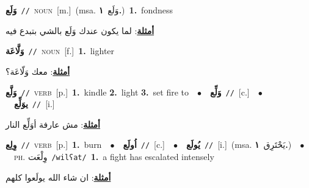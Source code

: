 \documentclass[10pt,a4paper,twoside]{article} %
\begin{document}
\begin{multicols}{2}
{\setlength\topsep{0pt}\textbf{\foreignlanguage{arabic}{وَلَع}}\ {\color{gray}\texttt{//}\color{black}}\ \textsc{noun}\ [m.]\ \color{gray}(msa. \foreignlanguage{arabic}{وَلَع}~\foreignlanguage{arabic}{\textbf{١.}})\color{black}\ \textbf{1.}~fondness\  \begin{flushright}\color{gray}\foreignlanguage{arabic}{\textbf{\underline{\foreignlanguage{arabic}{أمثلة}}}: لما يكون عندك وَلَع بالشي بتبدع فيه}\end{flushright}\color{black}} \vspace{2mm}

{\setlength\topsep{0pt}\textbf{\foreignlanguage{arabic}{وَلَّاعَة}}\ {\color{gray}\texttt{//}\color{black}}\ \textsc{noun}\ [f.]\ \textbf{1.}~lighter\  \begin{flushright}\color{gray}\foreignlanguage{arabic}{\textbf{\underline{\foreignlanguage{arabic}{أمثلة}}}: معك وَلّاعَة؟}\end{flushright}\color{black}} \vspace{2mm}

{\setlength\topsep{0pt}\textbf{\foreignlanguage{arabic}{وَلَّع}}\ {\color{gray}\texttt{//}\color{black}}\ \textsc{verb}\ [p.]\ \textbf{1.}~kindle  \textbf{2.}~light  \textbf{3.}~set fire to\ \ $\bullet$\ \ \setlength\topsep{0pt}\textbf{\foreignlanguage{arabic}{وَلِّع}}\ {\color{gray}\texttt{//}\color{black}}\ [c.]\ \ $\bullet$\ \ \setlength\topsep{0pt}\textbf{\foreignlanguage{arabic}{يوَلِّع}}\ {\color{gray}\texttt{//}\color{black}}\ [i.]\  \begin{flushright}\color{gray}\foreignlanguage{arabic}{\textbf{\underline{\foreignlanguage{arabic}{أمثلة}}}: مش عارفة أوَلِّع النار}\end{flushright}\color{black}} \vspace{2mm}

{\setlength\topsep{0pt}\textbf{\foreignlanguage{arabic}{وِلِع}}\ {\color{gray}\texttt{//}\color{black}}\ \textsc{verb}\ [p.]\ \textbf{1.}~burn\ \ $\bullet$\ \ \setlength\topsep{0pt}\textbf{\foreignlanguage{arabic}{اُولَع}}\ {\color{gray}\texttt{//}\color{black}}\ [c.]\ \ $\bullet$\ \ \setlength\topsep{0pt}\textbf{\foreignlanguage{arabic}{يُولَع}}\ {\color{gray}\texttt{//}\color{black}}\ [i.]\ \color{gray}(msa. \foreignlanguage{arabic}{يَحْتَرِق}~\foreignlanguage{arabic}{\textbf{١.}})\color{black}\ \ $\bullet$\ \ \textsc{ph.} \color{gray} \foreignlanguage{arabic}{وِلْعَت}\color{black}\ {\color{gray}\texttt{/{\sffamily wilʕat}/}\color{black}}\ \textbf{1.}~a fight has escalated intensely\  \begin{flushright}\color{gray}\foreignlanguage{arabic}{\textbf{\underline{\foreignlanguage{arabic}{أمثلة}}}: ان شاء الله يولَعوا كلهم}\end{flushright}\color{black}} \vspace{2mm}


\end{multicols}
\end{document}

